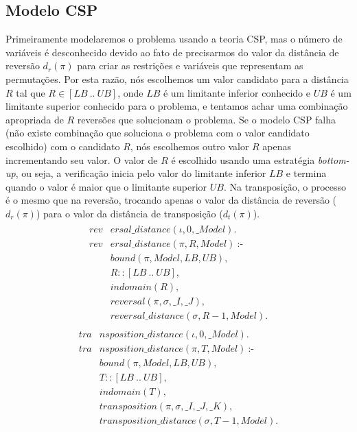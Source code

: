 \subsection{Modelo CSP}
\label{subsec:modelcsp}
Primeiramente modelaremos o problema usando a teoria CSP, mas o número
de variáveis é desconhecido devido ao fato de precisarmos do valor da
distância de reversão $d_{r}(\pi)$ para criar as restrições e
variáveis que representam as permutações. Por esta razão, nós
escolhemos um valor candidato para a distância $R$ tal que $R \in
[LB~..~UB]$, onde $LB$ é um limitante inferior conhecido e $UB$ é um
limitante superior conhecido para o problema, e tentamos achar uma
combinação apropriada de $R$ reversões que solucionam o problema. Se o
modelo CSP falha (não existe combinação que soluciona o problema com o
valor candidato escolhido) com o candidato $R$, nós escolhemos outro
valor $R$ apenas incrementando seu valor. O valor de $R$ é escolhido
usando uma estratégia \textit{bottom-up}, ou seja, a verificação
inicia pelo valor do limitante inferior $LB$ e termina quando o valor
é maior que o limitante superior $UB$. Na transposição, o processo é o
mesmo que na reversão, trocando apenas o valor da distância de
reversão ($d_{r}(\pi)$) para o valor da distância de transposição
($d_{t}(\pi)$).
\begin{align}
  \label{revdistance}
  \begin{split}
  \textit{rev}&\textit{ersal\_distance}(\iota, 0, \_Model). \\
  \textit{rev}&\textit{ersal\_distance}(\pi, R, Model)~\text{:-} \\
  &\textit{bound}(\pi, Model, LB, UB), \\
  &R :: [LB~..~UB], \\
  &\textit{indomain}(R),  \\
  &\textit{reversal}(\pi, \sigma, \_I, \_J),  \\
  &\textit{reversal\_distance}(\sigma, R-1, Model). 
  \end{split}
\end{align}
\begin{align}
  \label{tradistance}
  \begin{split}
  \textit{tra}&\textit{nsposition\_distance}(\iota, 0, \_Model). \\
  \textit{tra}&\textit{nsposition\_distance}(\pi, T, Model)~\text{:-} \\
  &\textit{bound}(\pi, Model, LB, UB), \\
  &T :: [LB~..~UB], \\
  &\textit{indomain}(T),  \\
  &\textit{transposition}(\pi, \sigma, \_I, \_J, \_K),  \\
  &\textit{transposition\_distance}(\sigma, T-1, Model). 
  \end{split}
\end{align}

